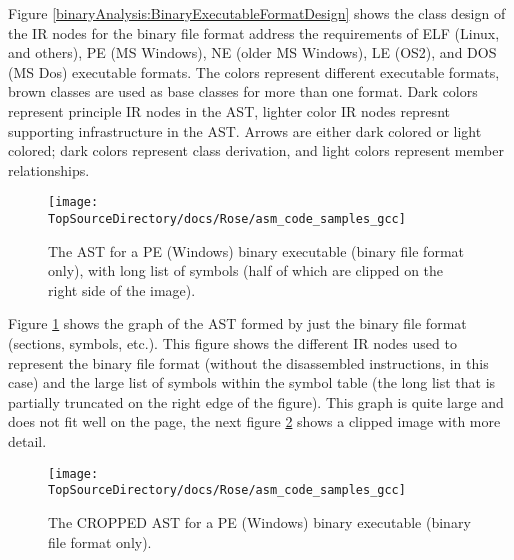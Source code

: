 Figure \ref{binaryAnalysis:BinaryExecutableFormatDesign} shows the class design of the IR
nodes for the binary file format address the
requirements of ELF (Linux, and others), PE (MS Windows), NE (older MS Windows), 
LE (OS\/2), and DOS (MS Dos) executable formats.  The colors represent different
executable formats, brown classes are used as base classes for more than one
format. Dark colors represent principle IR nodes in the AST, lighter color IR nodes
represnt supporting infrastructure in the AST.  Arrows are either dark colored or
light colored; dark colors represent class derivation, and light colors represent
member relationships.

\begin{figure}
\texttt{[image: \\TopSourceDirectory/docs/Rose/asm\_code\_samples\_gcc]}
\caption{The AST for a PE (Windows) binary executable (binary file format only), with long
    list of symbols (half of which are clipped on the right side of the image).} 

\label{binaryAnalysis:BinaryExecutableFormatAST_1}
\end{figure}

Figure \ref{binaryAnalysis:BinaryExecutableFormatAST_1} shows the graph of the AST
formed by just the binary file format (sections, symbols, etc.).  This figure shows
the different IR nodes used to represent the binary file format (without the disassembled 
instructions, in this case) and the large list of symbols within the symbol table (the 
long list that is partially truncated on the right edge of the figure).
This graph is quite large and does not fit well on the page, the next figure
\ref{binaryAnalysis:BinaryExecutableFormatAST_2} shows a clipped image with more detail.


\begin{figure}
\texttt{[image: \\TopSourceDirectory/docs/Rose/asm\_code\_samples\_gcc]}
\caption{The CROPPED AST for a PE (Windows) binary executable (binary file format only).} 

\label{binaryAnalysis:BinaryExecutableFormatAST_2}
\end{figure}

